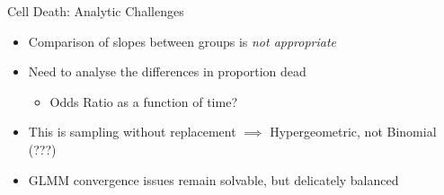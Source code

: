 \documentclass[11pt]{beamer}
\begin{document}
\begin{frame}{Cell Death: Analytic Challenges}

	\begin{itemize}
		\item Comparison of slopes between groups is \textit{not appropriate}
		\item Need to analyse the differences in proportion dead
		\begin{itemize}
			\item Odds Ratio as a function of time?
		\end{itemize}
		\item This is sampling without replacement $\implies$ Hypergeometric, not Binomial (???)
		\item GLMM convergence issues remain solvable, but delicately balanced
	\end{itemize}

\end{frame}
\end{document}
